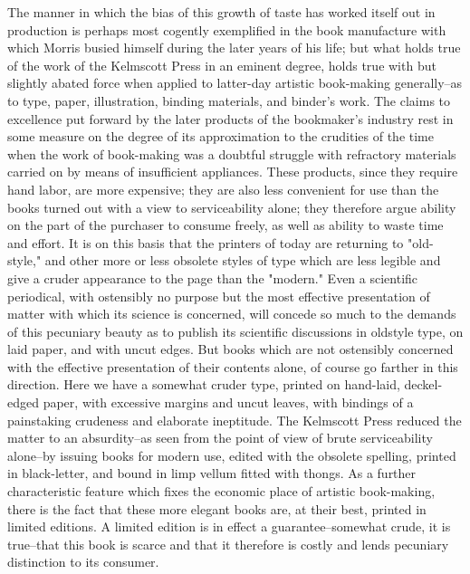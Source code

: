 \documentclass[12pt]{report}
\begin{document}
The manner in which the bias of this growth of taste has worked itself
out in production is perhaps most cogently exemplified in the book
manufacture with which Morris busied himself during the later years of
his life; but what holds true of the work of the Kelmscott Press in an
eminent degree, holds true with but slightly abated force when applied
to latter-day artistic book-making generally--as to type, paper,
illustration, binding materials, and binder's work. The claims to
excellence put forward by the later products of the bookmaker's industry
rest in some measure on the degree of its approximation to the crudities
of the time when the work of book-making was a doubtful struggle with
refractory materials carried on by means of insufficient appliances.
These products, since they require hand labor, are more expensive; they
are also less convenient for use than the books turned out with a view
to serviceability alone; they therefore argue ability on the part of
the purchaser to consume freely, as well as ability to waste time and
effort. It is on this basis that the printers of today are returning to
"old-style," and other more or less obsolete styles of type which are
less legible and give a cruder appearance to the page than the "modern."
Even a scientific periodical, with ostensibly no purpose but the most
effective presentation of matter with which its science is concerned,
will concede so much to the demands of this pecuniary beauty as to
publish its scientific discussions in oldstyle type, on laid paper, and
with uncut edges. But books which are not ostensibly concerned with the
effective presentation of their contents alone, of course go farther
in this direction. Here we have a somewhat cruder type, printed on
hand-laid, deckel-edged paper, with excessive margins and uncut leaves,
with bindings of a painstaking crudeness and elaborate ineptitude. The
Kelmscott Press reduced the matter to an absurdity--as seen from the
point of view of brute serviceability alone--by issuing books for modern
use, edited with the obsolete spelling, printed in black-letter, and
bound in limp vellum fitted with thongs. As a further characteristic
feature which fixes the economic place of artistic book-making, there
is the fact that these more elegant books are, at their best, printed in
limited editions. A limited edition is in effect a guarantee--somewhat
crude, it is true--that this book is scarce and that it therefore is
costly and lends pecuniary distinction to its consumer.
\end{document}
